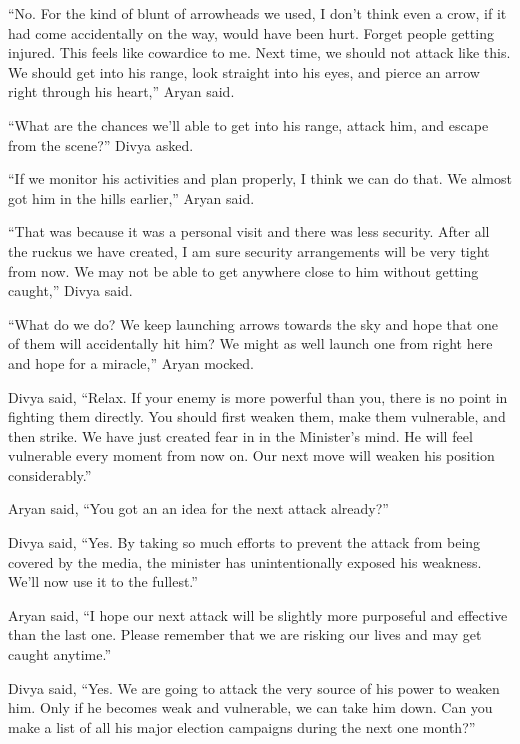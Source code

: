 “No. For the kind of blunt of arrowheads we used, I don't think even a crow, if
it had come accidentally on the way, would have been hurt. Forget people getting
injured. This feels like cowardice to me. Next time, we should not attack like
this. We should get into his range, look straight into his eyes, and pierce an
arrow right through his heart,” Aryan said.

“What are the chances we'll able to get into his range, attack him, and escape
from the scene?” Divya asked.

“If we monitor his activities and plan properly, I think we can do that. We
almost got him in the hills earlier,” Aryan said.

“That was because it was a personal visit and there was less security. After all
the ruckus we have created, I am sure security arrangements will be very tight
from now. We may not be able to get anywhere close to him without getting
caught,” Divya said.

“What do we do? We keep launching arrows towards the sky and hope that one of
them will accidentally hit him? We might as well launch one from right here and
hope for a miracle,” Aryan mocked.

Divya said, “Relax. If your enemy is more powerful than you, there is no point
in fighting them directly. You should first weaken them, make them vulnerable,
and then strike. We have just created fear in in the Minister's mind. He will
feel vulnerable every moment from now on. Our next move will weaken his position
considerably.”

Aryan said, “You got an an idea for the next attack already?”

Divya said, “Yes. By taking so much efforts to prevent the attack from being
covered by the media, the minister has unintentionally exposed his weakness.
We'll now use it to the fullest.”

Aryan said, “I hope our next attack will be slightly more purposeful and
effective than the last one. Please remember that we are risking our lives and
may get caught anytime.”

Divya said, “Yes. We are going to attack the very source of his power to weaken
him. Only if he becomes weak and vulnerable, we can take him down. Can you make
a list of all his major election campaigns during the next one month?”